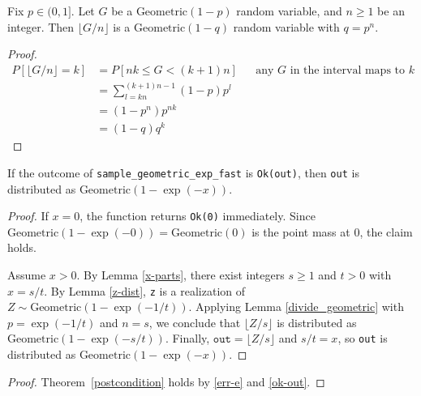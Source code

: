 \documentclass{article}
\begin{document}
\begin{lemma}\label{divide_geometric}\cite{CKS20}
    Fix $p \in (0, 1]$. Let $G$ be a $\textrm{Geometric}(1 - p)$ random variable, and $n \geq 1$ be an integer.
    Then $\lfloor G / n \rfloor$ is a $\textrm{Geometric}(1 - q)$ random variable with $q = p^n$.
\end{lemma}

\begin{proof}
    \begin{align*}
        P[\lfloor G/n \rfloor = k] &= P[nk \le G < (k + 1)n] &&\text{any $G$ in the interval maps to $k$} \\
        &= \sum_{l=kn}^{(k+1)n - 1} (1 - p)p^l \\
        &= (1 - p^n)p^{nk} \\
        &= (1 - q)q^k
    \end{align*}
\end{proof}

\begin{lemma}\label{ok-out}
    If the outcome of \texttt{sample\_geometric\_exp\_fast} is \texttt{Ok(out)},
    then \texttt{out} is distributed as $\textrm{Geometric}(1 - \exp(-x))$.
\end{lemma}

\begin{proof}
    If $x = 0$, the function returns \texttt{Ok(0)} immediately. Since
    $\textrm{Geometric}(1 - \exp(-0)) = \textrm{Geometric}(0)$ is the point mass at $0$,
    the claim holds.

    Assume $x > 0$. By Lemma \ref{x-parts}, there exist integers $s \geq 1$ and $t > 0$ with $x = s/t$.
    By Lemma \ref{z-dist}, \texttt{z} is a realization of $Z \sim \textrm{Geometric}(1 - \exp(-1/t))$.
    Applying Lemma \ref{divide_geometric} with $p = \exp(-1/t)$ and $n = s$,
    we conclude that $\lfloor Z / s \rfloor$ is distributed as $\textrm{Geometric}(1 - \exp(-s/t))$.
    Finally, $\texttt{out} = \lfloor Z / s \rfloor$ and $s/t = x$, so
    \texttt{out} is distributed as $\textrm{Geometric}(1 - \exp(-x))$.
\end{proof}

\begin{proof}
    Theorem~\ref{postcondition} holds by \ref{err-e} and \ref{ok-out}.
\end{proof}



\end{document}
